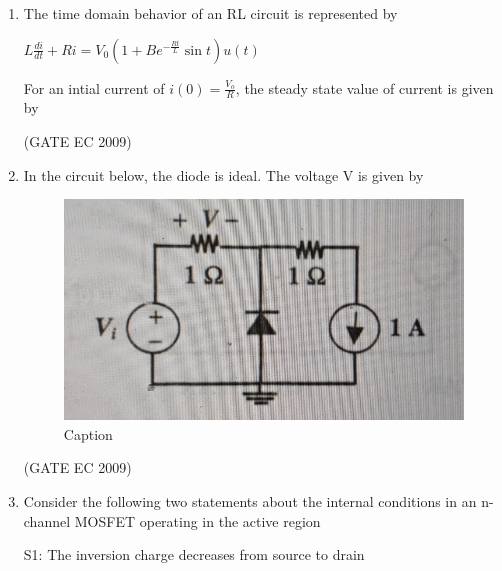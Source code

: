 \documentclass[journal,12pt,onecolumn]{IEEEtran}
\theoremstyle{remark}
\begin{document}
\begin{enumerate}[start=1, label={Q\arabic*.}]
\item The time domain behavior of an RL circuit is represented by 
\begin{center} 
$L\frac{di}{dt} + Ri = V_0 (1+ Be^{-\frac{Rt}{L}} \sin t ) u(t)$
\end{center}

For an intial current of $i(0) = \frac{V_o}{R}$, the steady state value of current is given by 

\begin{enumerate}[label=(\Alph*)]
\end{enumerate}
\hfill (GATE EC 2009)

\item In the circuit below, the diode is ideal. The voltage V is given by
\begin{figure}[H]
    \centering
    \includegraphics[width=0.5\linewidth]{images/img_12.jpg}
    \caption{Caption}
    \label{fig:placeholder}
\end{figure}
\begin{enumerate}[label=(\Alph*)]
\end{enumerate}
\hfill (GATE EC 2009)

\item Consider the following two statements about the internal conditions in an n-channel MOSFET operating in the active region 
\begin{center}
    S1: The inversion charge decreases from source to drain
    

\end{center}
\end{enumerate}
\end{document}
